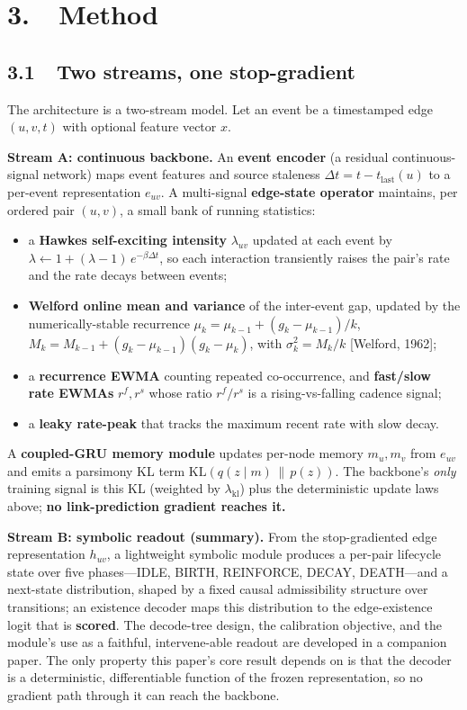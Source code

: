 \documentclass[conference]{IEEEtran}
\begin{document}
\section*{3.~~Method}

\subsection*{3.1~~Two streams, one stop-gradient}

The architecture is a two-stream model. Let an event be a timestamped edge \((u, v, t)\) with optional feature vector \(x\).

\textbf{Stream A: continuous backbone.} An \textbf{event encoder} (a residual continuous-signal network) maps event features and source staleness \(\Delta t = t - t_{\text{last}}(u)\) to a per-event representation \(e_{uv}\). A multi-signal \textbf{edge-state operator} maintains, per ordered pair \((u,v)\), a small bank of running statistics:

\begin{itemize}
\item a \textbf{Hawkes self-exciting intensity} \(\lambda_{uv}\) updated at each event by \(\lambda \leftarrow 1 + (\lambda - 1)\,e^{-\beta \Delta t}\), so each interaction transiently raises the pair's rate and the rate decays between events;
\item \textbf{Welford online mean and variance} of the inter-event gap, updated by the numerically-stable recurrence \(\mu_k = \mu_{k-1} + (g_k - \mu_{k-1})/k\), \(M_k = M_{k-1} + (g_k - \mu_{k-1})(g_k - \mu_k)\), with \(\sigma_k^2 = M_k/k\) [Welford, 1962];
\item a \textbf{recurrence EWMA} counting repeated co-occurrence, and \textbf{fast/slow rate EWMAs} \(r^f, r^s\) whose ratio \(r^f/r^s\) is a rising-vs-falling cadence signal;
\item a \textbf{leaky rate-peak} that tracks the maximum recent rate with slow decay.
\end{itemize}

A \textbf{coupled-GRU memory module} updates per-node memory \(m_u, m_v\) from \(e_{uv}\) and emits a parsimony KL term \(\mathrm{KL}(q(z \mid m) \,\|\, p(z))\). The backbone's \emph{only} training signal is this KL (weighted by \(\lambda_{\text{kl}}\)) plus the deterministic update laws above; \textbf{no link-prediction gradient reaches it.}

\textbf{Stream B: symbolic readout (summary).} From the stop-gradiented edge representation \(h_{uv}\), a lightweight symbolic module produces a per-pair lifecycle state over five phases---IDLE, BIRTH, REINFORCE, DECAY, DEATH---and a next-state distribution, shaped by a fixed causal admissibility structure over transitions; an existence decoder maps this distribution to the edge-existence logit that is \textbf{scored}. The decode-tree design, the calibration objective, and the module's use as a faithful, intervene-able readout are developed in a companion paper. The only property this paper's core result depends on is that the decoder is a deterministic, differentiable function of the frozen representation, so no gradient path through it can reach the backbone.
\end{document}
